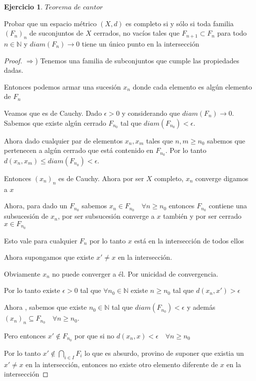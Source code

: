 \documentclass[11pt]{report}
\newcommand{\N}{\mathbb{N}}
\newcommand{\Ra}{\Rightarrow}
\newcommand{\ra}{\rightarrow}
\theoremstyle{definition}
\newtheorem{ej}{Ejercicio}
\begin{document}
	\begin{ej}
	$Teorema$ $de$ $cantor$

	Probar que un espacio métrico $(X,d)$ es completo si y sólo si toda familia $(F_n)_n$ de suconjuntos de $X$ cerrados, no vacíos tales que $F_{n+1} \subset F_n$ para todo $n \in \N$ y $diam(F_n) \ra 0$ tiene un único punto en la intersección

		\begin{proof}
			$\Ra$) Tenemos una familia de subconjuntos que cumple las propiedades dadas.

			Entonces podemos armar una sucesión $x_n$ donde cada elemento es algún elemento de $F_n$

			Veamos que es de Cauchy. Dado $\epsilon >0$ y considerando que $diam(F_n) \ra 0$. Sabemos que existe algún cerrado $F_{n_0}$ tal que $diam(F_{n_0}) < \epsilon$.

			Ahora dado cualquier par de elementos $x_n, x_m$ tales que $n,m \geq n_0$ sabemos que pertenecen a algún cerrado que está contenido en $F_{n_0}$. Por lo tanto $d(x_n,x_m) \leq diam(F_{n_0}) < \epsilon$.

			Entonces $(x_n)_n$ es de Cauchy. Ahora por ser $X$ completo, $x_n$ converge digamos a $x$

			Ahora, para dado un $F_{n_0}$ sabemos $x_n \in F_{n_0} \quad \forall n \geq n_0$ entonces $F_{n_0}$ contiene una subsucesión de $x_n$, por ser subsucesión converge a $x$ también y por ser cerrado $x\in F_{n_0}$ 

			Esto vale para cualquier $F_{n}$ por lo tanto $x$ está en la intersección de todos ellos

			Ahora supongamos que existe $x'\neq x$ en la intersección. 

			Obviamente $x_n$ no puede converger a él. Por unicidad de convergencia. 

			Por lo tanto existe $\epsilon > 0$ tal que $\forall n_0\in \N$ existe $n \geq n_0$ tal que $d(x_n,x') > \epsilon$

			Ahora , sabemos que existe $n_0 \in \N$ tal que $diam(F_{n_0}) < \epsilon$ y además  $(x_n)_n \subseteq F_{n_0} \quad \forall n \geq n_0$.

			Pero entonces $x' \notin F_{n_0}$ por que si no $d(x_n,x) < \epsilon \quad \forall n\geq n_0$

			Por lo tanto $x' \notin \bigcap_{i \in I} F_i$ lo que es absurdo, provino de suponer que existia un $x'\neq x$ en la intersección, entonces no existe otro elemento diferente de $x$ en la intersección


\end{proof}
\end{ej}
\end{document}
